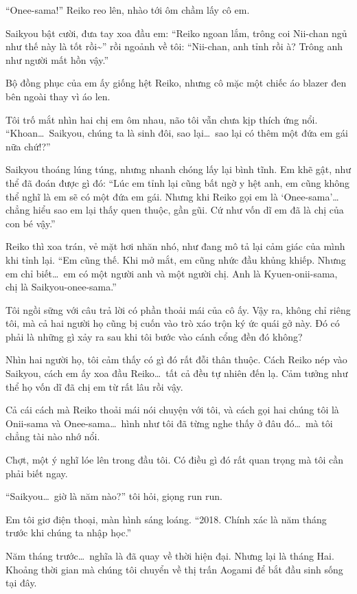 \documentclass[../main.tex]{subfiles}
\begin{document}
``Onee-sama!'' Reiko reo lên, nhào tới ôm chầm lấy cô em.

Saikyou bật cười, đưa tay xoa đầu em: ``Reiko ngoan lắm, trông coi Nii-chan ngủ như thế này là tốt rồi\~{}'' rồi ngoảnh về tôi: ``Nii-chan, anh tỉnh rồi à? Trông anh như người mất hồn vậy.''

Bộ đồng phục của em ấy giống hệt Reiko, nhưng cô mặc một chiếc áo blazer đen bên ngoài thay vì áo len.

Tôi trố mắt nhìn hai chị em ôm nhau, não tôi vẫn chưa kịp thích ứng nổi. ``Khoan\dots\ Saikyou, chúng ta là sinh đôi, sao lại\dots\ sao lại có thêm một đứa em gái nữa chứ!?''

Saikyou thoáng lúng túng, nhưng nhanh chóng lấy lại bình tĩnh. Em khẽ gật, như thể đã đoán được gì đó: ``Lúc em tỉnh lại cũng bất ngờ y hệt anh, em cũng không thể nghĩ là em sẽ có một đứa em gái. Nhưng khi Reiko gọi em là `Onee-sama'\dots chẳng hiểu sao em lại thấy quen thuộc, gần gũi. Cứ như vốn dĩ em đã là chị của con bé vậy.''

Reiko thì xoa trán, vẻ mặt hơi nhăn nhó, như đang mô tả lại cảm giác của mình khi tỉnh lại. ``Em cũng thế. Khi mở mắt, em cũng nhức đầu khủng khiếp. Nhưng em chỉ biết\dots\ em có một người anh và một người chị. Anh là Kyuen-onii-sama, chị là Saikyou-onee-sama.''

Tôi ngồi sững với câu trả lời có phần thoải mái của cô ấy. Vậy ra, không chỉ riêng tôi, mà cả hai người họ cũng bị cuốn vào trò xáo trộn ký ức quái gở này. Đó có phải là những gì xảy ra sau khi tôi bước vào cánh cổng đền đó không?

Nhìn hai người họ, tôi cảm thấy có gì đó rất đỗi thân thuộc. Cách Reiko nép vào Saikyou, cách em ấy xoa đầu Reiko\dots\ tất cả đều tự nhiên đến lạ. Cảm tưởng như thể họ vốn dĩ đã chị em từ rất lâu rồi vậy.

Cả cái cách mà Reiko thoải mái nói chuyện với tôi, và cách gọi hai chúng tôi là Onii-sama và Onee-sama\dots\ hình như tôi đã từng nghe thấy ở đâu đó\dots\ mà tôi chẳng tài nào nhớ nổi.

Chợt, một ý nghĩ lóe lên trong đầu tôi. Có điều gì đó rất quan trọng mà tôi cần phải biết ngay.

``Saikyou\dots\ giờ là năm nào?'' tôi hỏi, giọng run run.

Em tôi giơ điện thoại, màn hình sáng loáng. ``2018. Chính xác là năm tháng trước khi chúng ta nhập học.''

Năm tháng trước\dots\ nghĩa là đã quay về thời hiện đại. Nhưng lại là tháng Hai. Khoảng thời gian mà chúng tôi chuyển về thị trấn Aogami để bắt đầu sinh sống tại đây.
\end{document}
